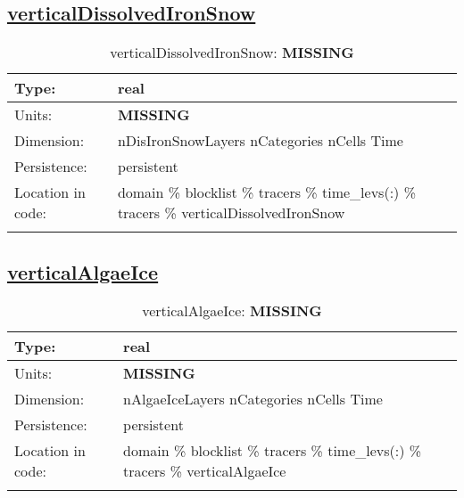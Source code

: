 \subsection[verticalDissolvedIronSnow]{\hyperref[sec:var_tab_tracers]{verticalDissolvedIronSnow}}
\label{subsec:var_sec_tracers_verticalDissolvedIronSnow}
\begin{center}
\begin{longtable}{| p{2.0in} | p{4.0in} |}
        \hline 
        Type: & real \\
        \hline 
        Units: & {\bf \color{red} MISSING} \\
        \hline 
        Dimension: & nDisIronSnowLayers nCategories nCells Time \\
        \hline 
        Persistence: & persistent \\
        \hline 
         Location in code: & domain \% blocklist \% tracers \% time\_levs(:) \% tracers \% verticalDissolvedIronSnow \\
         \hline 
    \caption{verticalDissolvedIronSnow: {\bf \color{red} MISSING}}
\end{longtable}
\end{center}
\subsection[verticalAlgaeIce]{\hyperref[sec:var_tab_tracers]{verticalAlgaeIce}}
\label{subsec:var_sec_tracers_verticalAlgaeIce}
\begin{center}
\begin{longtable}{| p{2.0in} | p{4.0in} |}
        \hline 
        Type: & real \\
        \hline 
        Units: & {\bf \color{red} MISSING} \\
        \hline 
        Dimension: & nAlgaeIceLayers nCategories nCells Time \\
        \hline 
        Persistence: & persistent \\
        \hline 
         Location in code: & domain \% blocklist \% tracers \% time\_levs(:) \% tracers \% verticalAlgaeIce \\
         \hline 
    \caption{verticalAlgaeIce: {\bf \color{red} MISSING}}
\end{longtable}
\end{center}
